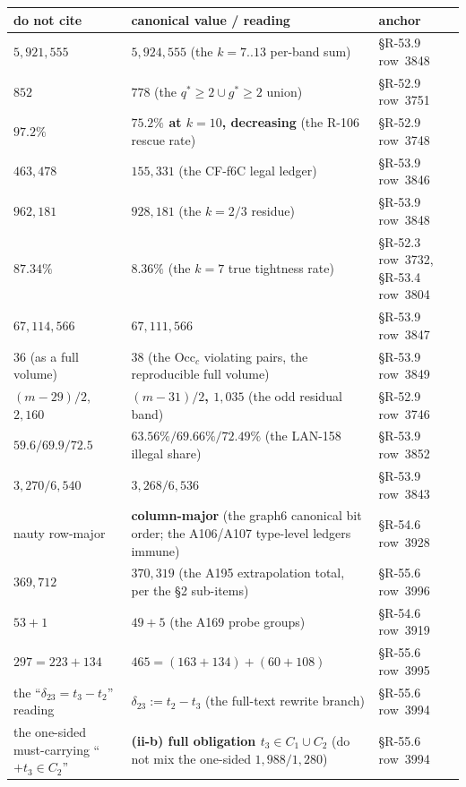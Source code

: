 \small
\begin{longtable}{p{}p{}p{}}
\hline
do not cite & canonical value / reading & anchor \\
\hline
\endhead
\hline
\endfoot
$5{,}921{,}555$ & \textbf{$5{,}924{,}555$} (the $k=7..13$ per-band sum) & \S R-53.9 row~3848 \\
$852$ & \textbf{$778$} (the $q^*\ge2\cup g^*\ge2$ union) & \S R-52.9 row~3751 \\
$97.2\%$ & \textbf{$75.2\%$ at $k=10$, decreasing} (the R-106 rescue rate) & \S R-52.9 row~3748 \\
$463{,}478$ & \textbf{$155{,}331$} (the CF-f6C legal ledger) & \S R-53.9 row~3846 \\
$962{,}181$ & \textbf{$928{,}181$} (the $k=2/3$ residue) & \S R-53.9 row~3848 \\
$87.34\%$ & \textbf{$8.36\%$} (the $k=7$ true tightness rate) & \S R-52.3 row~3732, \S R-53.4 row~3804 \\
$67{,}114{,}566$ & \textbf{$67{,}111{,}566$} & \S R-53.9 row~3847 \\
$36$ (as a full volume) & \textbf{$38$} (the Occ$_c$ violating pairs, the reproducible full volume) & \S R-53.9 row~3849 \\
$(m-29)/2$, $2{,}160$ & \textbf{$(m-31)/2$, $1{,}035$} (the odd residual band) & \S R-52.9 row~3746 \\
$59.6/69.9/72.5$ & \textbf{$63.56\%/69.66\%/72.49\%$} (the LAN-158 illegal share) & \S R-53.9 row~3852 \\
$3{,}270/6{,}540$ & \textbf{$3{,}268/6{,}536$} & \S R-53.9 row~3843 \\
nauty row-major & \textbf{column-major} (the graph6 canonical bit order; the A106/A107 type-level ledgers immune) & \S R-54.6 row~3928 \\
$369{,}712$ & \textbf{$370{,}319$} (the A195 extrapolation total, per the \S2 sub-items) & \S R-55.6 row~3996 \\
$53+1$ & \textbf{$49+5$} (the A169 probe groups) & \S R-54.6 row~3919 \\
$297=223+134$ & \textbf{$465=(163+134)+(60+108)$} & \S R-55.6 row~3995 \\
the ``$\delta_{23}=t_3-t_2$'' reading & \textbf{$\delta_{23}:=t_2-t_3$} (the full-text rewrite branch) & \S R-55.6 row~3994 \\
the one-sided must-carrying ``$+t_3\in C_2$'' & \textbf{(ii-b) full obligation $t_3\in C_1\cup C_2$} (do not mix the one-sided $1{,}988/1{,}280$) & \S R-55.6 row~3994 \\

\end{longtable}

